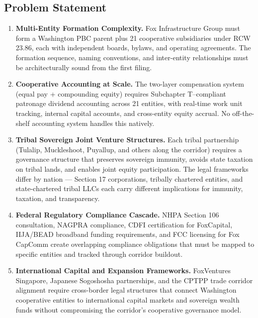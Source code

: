 \documentclass[11pt,letterpaper]{article}
\begin{document}
\subsection{Problem Statement}

\begin{enumerate}[leftmargin=2em]
  \item \textbf{Multi-Entity Formation Complexity.} Fox Infrastructure Group must form a Washington PBC parent plus 21 cooperative subsidiaries under RCW 23.86, each with independent boards, bylaws, and operating agreements. The formation sequence, naming conventions, and inter-entity relationships must be architecturally sound from the first filing.

  \item \textbf{Cooperative Accounting at Scale.} The two-layer compensation system (equal pay + compounding equity) requires Subchapter T--compliant patronage dividend accounting across 21 entities, with real-time work unit tracking, internal capital accounts, and cross-entity equity accrual. No off-the-shelf accounting system handles this natively.

  \item \textbf{Tribal Sovereign Joint Venture Structures.} Each tribal partnership (Tulalip, Muckleshoot, Puyallup, and others along the corridor) requires a governance structure that preserves sovereign immunity, avoids state taxation on tribal lands, and enables joint equity participation. The legal frameworks differ by nation --- Section 17 corporations, tribally chartered entities, and state-chartered tribal LLCs each carry different implications for immunity, taxation, and transparency.

  \item \textbf{Federal Regulatory Compliance Cascade.} NHPA Section 106 consultation, NAGPRA compliance, CDFI certification for FoxCapital, IIJA/BEAD broadband funding requirements, and FCC licensing for Fox CapComm create overlapping compliance obligations that must be mapped to specific entities and tracked through corridor buildout.

  \item \textbf{International Capital and Expansion Frameworks.} FoxVentures Singapore, Japanese Sogoshosha partnerships, and the CPTPP trade corridor alignment require cross-border legal structures that connect Washington cooperative entities to international capital markets and sovereign wealth funds without compromising the corridor's cooperative governance model.
\end{enumerate}
\end{document}
